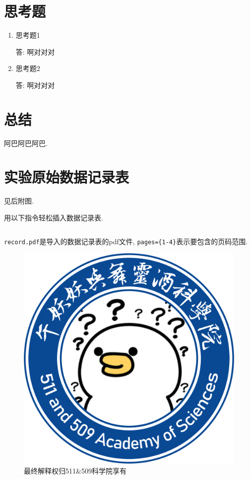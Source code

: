 \documentclass[11pt]{article}
\begin{document}
\section{思考题}

\begin{enumerate}
    \item 思考题1

    答: 啊对对对
    \item 思考题2

    答: 啊对对对
\end{enumerate}

\section{总结}

阿巴阿巴阿巴. 

\section{实验原始数据记录表}
见后附图. 

用以下指令轻松插入数据记录表. 
\begin{lstlisting}

\end{lstlisting}
\texttt{record.pdf}是导入的数据记录表的pdf文件, \texttt{pages=\{1-4\}}表示要包含的页码范围. 

\begin{figure}[htbp]
    \centering
    \includegraphics[width=16cm]{Fig/511&509.png}
    \caption{最终解释权归511\&509科学院享有}
\end{figure}
\end{document}
